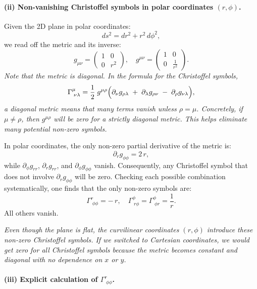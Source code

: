     \paragraph{(ii) Non-vanishing Christoffel symbols in polar coordinates \((r,\phi)\).}

    Given the 2D plane in polar coordinates:
    \[
        ds^2 = dr^2 + r^2\,d\phi^2,
    \]
    we read off the metric and its inverse:
    \[
        g_{\mu\nu}
        =
        \begin{pmatrix}
            1 & 0   \\
            0 & r^2
        \end{pmatrix},
        \quad
        g^{\mu\nu}
        =
        \begin{pmatrix}
            1 & 0             \\
            0 & \frac{1}{r^2}
        \end{pmatrix}.
    \]
    \emph{Note that the metric is diagonal. In the formula for the Christoffel symbols,}
    \[
        \Gamma^\mu_{\;\nu\lambda}
        =
        \frac{1}{2}\;g^{\mu\rho}
        \Bigl(
        \partial_\nu g_{\rho\lambda}
        \;+\;
        \partial_\lambda g_{\rho\nu}
        \;-\;
        \partial_\rho g_{\nu\lambda}
        \Bigr),
    \]
    \emph{a diagonal metric means that many terms vanish unless \(\rho = \mu\). Concretely, if \(\mu\neq\rho\), then \(g^{\mu\rho}\) will be zero for a strictly diagonal metric. This helps eliminate many potential non-zero symbols.}

    In polar coordinates, the only non-zero partial derivative of the metric is:
    \[
        \partial_r g_{\phi\phi} = 2\,r,
    \]
    while \(\partial_\phi g_{rr}\), \(\partial_r g_{rr}\), and \(\partial_\phi g_{\phi\phi}\) vanish. Consequently, any Christoffel symbol that does not involve \(\partial_r g_{\phi\phi}\) will be zero. Checking each possible combination systematically, one finds that the only non-zero symbols are:
    \[
        \Gamma^r_{\;\phi\phi} = -\,r,
        \quad
        \Gamma^\phi_{\;r\phi} = \Gamma^\phi_{\;\phi r} = \frac{1}{r}.
    \]
    All others vanish.

    \emph{Even though the plane is flat, the curvilinear coordinates \((r,\phi)\) introduce these non-zero Christoffel symbols. If we switched to Cartesian coordinates, we would get zero for all Christoffel symbols because the metric becomes constant and diagonal with no dependence on \(x\) or \(y\).}

    \paragraph{(iii) Explicit calculation of \(\Gamma^r_{\;\phi\phi}\).}

